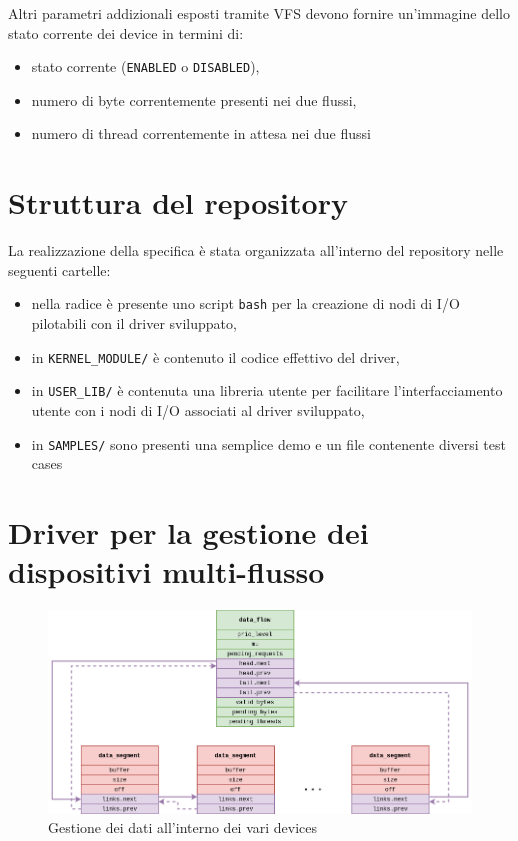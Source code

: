 \documentclass{article}
\begin{document}
Altri parametri addizionali esposti tramite VFS devono fornire un'immagine dello stato corrente dei device in termini di:
\begin{itemize}
        \item stato corrente (\texttt{ENABLED} o \texttt{DISABLED}),
        \item numero di byte correntemente presenti nei due flussi,
        \item numero di thread correntemente in attesa nei due flussi
\end{itemize}

\section*{Struttura del repository}
La realizzazione della specifica è stata organizzata all'interno del repository nelle seguenti cartelle:
\begin{itemize}
        \item nella radice è presente uno script \texttt{bash} per la creazione di nodi di I/O pilotabili con il driver sviluppato,
        \item in \texttt{KERNEL\_MODULE/} è contenuto il codice effettivo del driver,
        \item in \texttt{USER\_LIB/} è contenuta una libreria utente per facilitare l'interfacciamento utente con i nodi di I/O associati al driver sviluppato,
        \item in \texttt{SAMPLES/} sono presenti una semplice demo e un file contenente diversi test cases
\end{itemize}

\section*{Driver per la gestione dei dispositivi multi-flusso}
\begin{figure}[htbp]
        \centering
        \includegraphics[width=.8\textwidth]{data}
        \caption{Gestione dei dati all'interno dei vari devices}
        \label{fig:data}
\end{figure}
\end{document}
